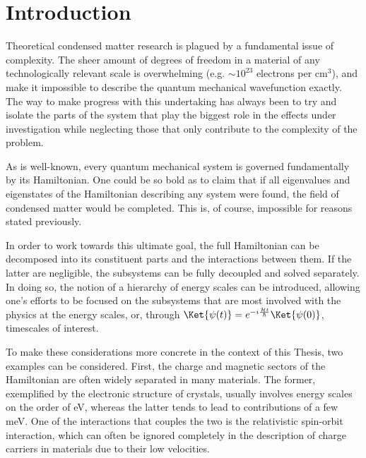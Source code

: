 \chapter{Introduction}
Theoretical condensed matter research is plagued by a fundamental issue of complexity. The sheer amount of degrees of freedom in a material of any technologically relevant scale is overwhelming (e.g. $\sim10^{23}$ electrons per cm$^3$), and make it impossible to describe the quantum mechanical wavefunction exactly.
The way to make progress with this undertaking has always been to try and isolate the parts of the system that play the biggest role in the effects under investigation while neglecting those that only contribute to the complexity of the problem.

As is well-known, every quantum mechanical system is governed fundamentally by its Hamiltonian.
One could be so bold as to claim that if all eigenvalues and eigenstates of the Hamiltonian describing any system were found, the field of condensed matter would be completed. This is, of course, impossible for reasons stated previously.

In order to work towards this ultimate goal, the full Hamiltonian can be decomposed into its constituent parts and the interactions between them.
If the latter are negligible, the subsystems can be fully decoupled and solved separately. In doing so, the notion of a hierarchy of energy scales can be introduced, allowing one's efforts to be focused on the subsystems that are most involved with the physics at the energy scales, or, through $\Ket{\psi(t)} = e^{-i \frac{\mathcal{H}t}{\hbar}}\Ket{\psi(0)}$, timescales of interest.

To make these considerations more concrete in the context of this Thesis, two examples can be considered.
First, the charge and magnetic sectors of the Hamiltonian are often widely separated in many materials.
The former, exemplified by the electronic structure of crystals, usually involves energy scales on the order of eV, whereas the latter tends to lead to contributions of a few meV.
One of the interactions that couples the two is the relativistic spin-orbit interaction, which can often be ignored completely in the description of charge carriers in materials due to their low velocities.

